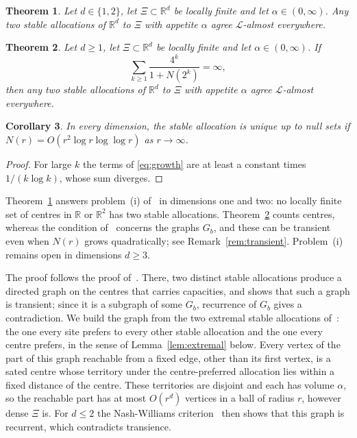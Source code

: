 \documentclass[11pt]{amsart}
\newtheorem{theorem}{Theorem}[section]
\newtheorem{corollary}[theorem]{Corollary}
\theoremstyle{remark}
\numberwithin{equation}{section}
\newcommand{\R}{\mathbb{R}}
\newcommand{\Leb}{\mathcal{L}}
\begin{document}
\begin{theorem}\label{thm:main}
Let $d\in\{1,2\}$, let $\Xi\subset\R^d$ be locally finite and let $\alpha\in(0,\infty)$. Any two stable allocations of $\R^d$ to $\Xi$ with appetite $\alpha$ agree $\Leb$-almost everywhere.
\end{theorem}

\begin{theorem}\label{thm:growth}
Let $d\ge1$, let $\Xi\subset\R^d$ be locally finite and let $\alpha\in(0,\infty)$. If
\begin{equation}\label{eq:growth}
\sum_{k\ge1}\frac{4^k}{1+N(2^k)}=\infty,
\end{equation}
then any two stable allocations of $\R^d$ to $\Xi$ with appetite $\alpha$ agree $\Leb$-almost everywhere.
\end{theorem}

\begin{corollary}\label{cor:growth}
In every dimension, the stable allocation is unique up to null sets if $N(r)=O(r^2\log r\log\log r)$ as $r\to\infty$.
\end{corollary}

\begin{proof}
For large $k$ the terms of \eqref{eq:growth} are at least a constant times $1/(k\log k)$, whose sum diverges.
\end{proof}

Theorem~\ref{thm:main} answers problem~(i) of~\cite{HHP} in dimensions one and two: no locally finite set of centres in $\R$ or $\R^2$ has two stable allocations. Theorem~\ref{thm:growth} counts centres, whereas the condition of~\cite[Theorem~2]{HHP} concerns the graphs $G_b$, and these can be transient even when $N(r)$ grows quadratically; see Remark~\ref{rem:transient}. Problem~(i) remains open in dimensions $d\ge3$.

The proof follows the proof of~\cite[Theorem~2]{HHP}. There, two distinct stable allocations produce a directed graph on the centres that carries capacities, and \cite[Proposition~13]{HHP} shows that such a graph is transient; since it is a subgraph of some $G_b$, recurrence of $G_b$ gives a contradiction. We build the graph from the two extremal stable allocations of~\cite[Lemma~15]{HHP}: the one every site prefers to every other stable allocation and the one every centre prefers, in the sense of Lemma~\ref{lem:extremal} below. Every vertex of the part of this graph reachable from a fixed edge, other than its first vertex, is a sated centre whose territory under the centre-preferred allocation lies within a fixed distance of the centre. These territories are disjoint and each has volume $\alpha$, so the reachable part has at most $O(r^d)$ vertices in a ball of radius $r$, however dense $\Xi$ is. For $d\le2$ the Nash-Williams criterion~\cite{NW} then shows that this graph is recurrent, which contradicts transience.
\end{document}
